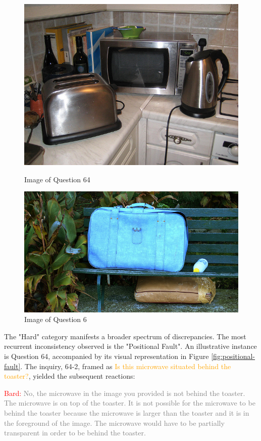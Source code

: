 \documentclass[journal,10pt]{IEEEtran}
\begin{document}
\begin{figure}[h]
    \centering
    \begin{minipage}{0.5\linewidth}
        \centering
        \includegraphics[width=0.8\linewidth]{../image set/hard/000000256309.jpg}
        \caption{Image of Question 64}
        \label{fig:positional-fault}
    \end{minipage}%
    \begin{minipage}{0.5\linewidth}
      \centering
      \includegraphics[width=0.8\linewidth]{../image set/easy/000000037024.jpg}
      \caption{Image of Question 6}
      \label{fig:vertical-fault}
    \end{minipage}
\end{figure}

The "Hard" category manifests a broader spectrum of discrepancies. The most recurrent inconsistency observed is the "Positional Fault". An illustrative instance is Question 64, accompanied by its visual representation in Figure \ref{fig:positional-fault}. The inquiry, 64-2, framed as \textcolor{orange}{Is this microwave situated behind the toaster?}, yielded the subsequent reactions:

\textcolor{red}{Bard:} \textcolor{gray}{No, the microwave in the image you provided is not behind the toaster. The microwave is on top of the toaster. It is not possible for the microwave to be behind the toaster because the microwave is larger than the toaster and it is in the foreground of the image. The microwave would have to be partially transparent in order to be behind the toaster.}
\end{document}
